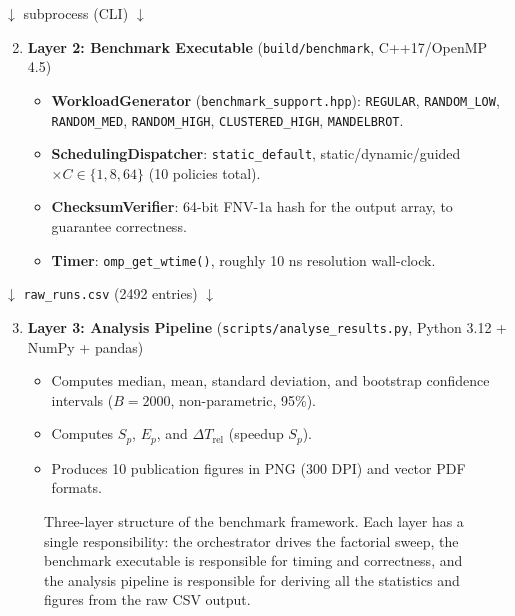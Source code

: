 \documentclass[conference]{IEEEtran}
\begin{document}
\begin{center}
\(\downarrow\) subprocess (CLI) \(\downarrow\)
\end{center}

\begin{enumerate}
    \setcounter{enumi}{1}
    \item \textbf{Layer 2: Benchmark Executable} (\texttt{build/benchmark}, C++17/OpenMP 4.5)
    \begin{itemize}
        \item \textbf{WorkloadGenerator} (\texttt{benchmark\_support.hpp}): \texttt{REGULAR}, \texttt{RANDOM\_LOW}, \texttt{RANDOM\_MED}, \texttt{RANDOM\_HIGH}, \texttt{CLUSTERED\_HIGH}, \texttt{MANDELBROT}.
        \item \textbf{SchedulingDispatcher}: \texttt{static\_default}, static/dynamic/guided \(\times C \in \{1,8,64\}\) (10 policies total).
        \item \textbf{ChecksumVerifier}: 64-bit FNV-1a hash for the output array, to guarantee correctness.
        \item \textbf{Timer}: \texttt{omp\_get\_wtime()}, roughly 10 ns resolution wall-clock.
    \end{itemize}
\end{enumerate}

\begin{center}
\(\downarrow\) \texttt{raw\_runs.csv} (2492 entries) \(\downarrow\)
\end{center}

\begin{enumerate}
    \setcounter{enumi}{2}
    \item \textbf{Layer 3: Analysis Pipeline} (\texttt{scripts/analyse\_results.py}, Python 3.12 + NumPy + pandas)
    \begin{itemize}
        \item Computes median, mean, standard deviation, and bootstrap confidence intervals (\(B=2000\), non-parametric, 95\%).
        \item Computes \(S_p\), \(E_p\), and \(\Delta T_{\text{rel}}\) (speedup \(S_p\)).
        \item Produces 10 publication figures in PNG (300 DPI) and vector PDF formats.
    \end{itemize}
\end{enumerate}

\begin{figure}[htbp]
    \centering
    \caption{Three-layer structure of the benchmark framework. Each layer has a single responsibility: the orchestrator drives the factorial sweep, the benchmark executable is responsible for timing and correctness, and the analysis pipeline is responsible for deriving all the statistics and figures from the raw CSV output.}
    \label{fig:arch}
\end{figure}
\end{document}
